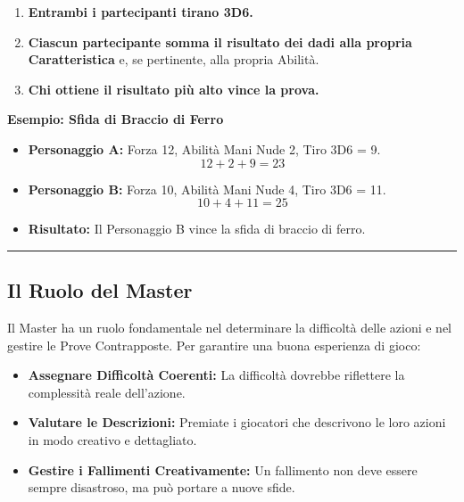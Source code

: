 \documentclass[../manuale_main.tex]{subfiles}
\begin{document}
\begin{enumerate}
    \item \textbf{Entrambi i partecipanti tirano 3D6.}
    \item \textbf{Ciascun partecipante somma il risultato dei dadi alla propria Caratteristica} e, se pertinente, alla propria Abilità.
    \item \textbf{Chi ottiene il risultato più alto vince la prova.}
\end{enumerate}

\textbf{Esempio: Sfida di Braccio di Ferro}

\begin{itemize}
    \item \textbf{Personaggio A:} Forza 12, Abilità Mani Nude 2, Tiro 3D6 = 9.
    \[
    12 + 2 + 9 = 23
    \]
    
    \item \textbf{Personaggio B:} Forza 10, Abilità Mani Nude 4, Tiro 3D6 = 11.
    \[
    10 + 4 + 11 = 25
    \]
    
    \item \textbf{Risultato:} Il Personaggio B vince la sfida di braccio di ferro.
\end{itemize}

\vspace{0.5cm}
\rule{\textwidth}{0.4pt}
\vspace{0.5cm}

\subsection{Il Ruolo del Master}
Il Master ha un ruolo fondamentale nel determinare la difficoltà delle azioni e nel gestire le Prove Contrapposte. Per garantire una buona esperienza di gioco:

\begin{itemize}
    \item \textbf{Assegnare Difficoltà Coerenti:} La difficoltà dovrebbe riflettere la complessità reale dell'azione.
    \item \textbf{Valutare le Descrizioni:} Premiate i giocatori che descrivono le loro azioni in modo creativo e dettagliato.
    \item \textbf{Gestire i Fallimenti Creativamente:} Un fallimento non deve essere sempre disastroso, ma può portare a nuove sfide.
\end{itemize}

\vspace{0.3cm}
\end{document}
